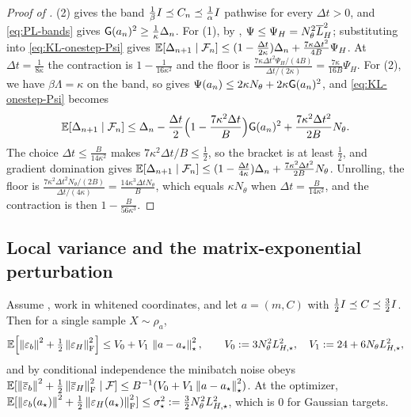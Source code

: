 \begin{proof}[Proof of ]
(2) gives the band $\tfrac1\beta I\preceq C_n\preceq\tfrac1\alpha I$ pathwise
for every $\Delta t>0$, and \eqref{eq:PL-bands} gives $\mathsf{G}(a_n)^2\geq\tfrac1\kappa\Delta_n$.
For (1), by , $\Psi\leq\Psi_H=N_\theta^2\overline{L}_H^2$; substituting into
\eqref{eq:KL-onestep-Psi} gives
$\mathbb{E}[\Delta_{n+1}\mid\mathcal{F}_n]\leq(1-\tfrac{\Delta t}{2\kappa})\Delta_n+\tfrac{7\kappa\Delta t^2}{4B}\Psi_H$.
At $\Delta t=\tfrac1{8\kappa}$ the contraction is $1-\tfrac1{16\kappa^2}$ and the floor is
$\tfrac{7\kappa\Delta t^2\Psi_H/(4B)}{\Delta t/(2\kappa)}=\tfrac{7\kappa}{16B}\Psi_H$.
For (2), we have $\beta\Lambda=\kappa$ on the band, so  gives
$\Psi(a_n)\leq2\kappa N_\theta+2\kappa\mathsf{G}(a_n)^2$, and \eqref{eq:KL-onestep-Psi} becomes
\[
    \mathbb{E}[\Delta_{n+1}\mid\mathcal{F}_n]
    \leq\Delta_n-\frac{\Delta t}2\Bigl(1-\frac{7\kappa^2\Delta t}B\Bigr)\mathsf{G}(a_n)^2+\frac{7\kappa^2\Delta t^2}{2B}N_\theta .
\]
The choice $\Delta t\leq\tfrac B{14\kappa^2}$ makes $7\kappa^2\Delta t/B\leq\tfrac12$, so the bracket is
at least $\tfrac12$, and gradient domination gives
$\mathbb{E}[\Delta_{n+1}\mid\mathcal{F}_n]\leq(1-\tfrac{\Delta t}{4\kappa})\Delta_n+\tfrac{7\kappa^2\Delta t^2}{2B}N_\theta$.
Unrolling, the floor is
$\tfrac{7\kappa^2\Delta t^2N_\theta/(2B)}{\Delta t/(4\kappa)}=\tfrac{14\kappa^3\Delta tN_\theta}B$,
which equals $\kappa N_\theta$ when $\Delta t=\tfrac B{14\kappa^2}$, and the contraction is then
$1-\tfrac B{56\kappa^3}$.
\end{proof}

\subsection{Local variance and the matrix-exponential perturbation}

\begin{lemma}
\label{lem:loc-variance}
Assume , work in whitened coordinates, and let
$a=(m,C)$ with $\tfrac12I\preceq C\preceq\tfrac32I$. Then for a single sample $X\sim\rho_a$,
\begin{equation}
\label{eq:local-var}
    \mathbb{E}\Bigl[\left\lVert \varepsilon_b\right\rVert^2+\tfrac12\left\lVert \varepsilon_H\right\rVert_{\mathrm{F}}^2\Bigr]
    \leq V_0+V_1\,\left\lVert a-a_\star\right\rVert_\star^2,
    \qquad
    V_0:=3N_\theta^2L_{H,\star}^2,\quad V_1:=24+6N_\theta L_{H,\star}^2 ,
\end{equation}
and by conditional independence the minibatch noise obeys
$\mathbb{E}[\left\lVert \overline\varepsilon_b\right\rVert^2+\tfrac12\left\lVert \overline\varepsilon_H\right\rVert_{\mathrm{F}}^2\mid\mathcal{F}]\leq B^{-1}(V_0+V_1\left\lVert a-a_\star\right\rVert_\star^2)$.
At the optimizer,
$\mathbb{E}[\left\lVert \varepsilon_b(a_\star)\right\rVert^2+\tfrac12\left\lVert \varepsilon_H(a_\star)\right\rVert_{\mathrm{F}}^2]\leq\sigma_\star^2:=\tfrac32N_\theta^2L_{H,\star}^2$,
which is $0$ for Gaussian targets.
\end{lemma}

